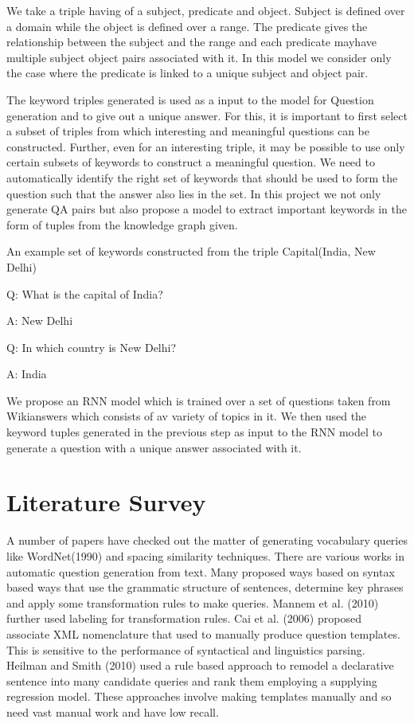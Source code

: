 \documentclass[conference]{IEEEtran}
\begin{document}
We take a triple having of a subject, predicate and object. Subject is defined over a domain
while the object is defined over a range. The predicate gives the relationship between the
subject and the range and each predicate mayhave multiple subject object pairs associated
with it. In this model we consider only the case where the predicate is linked to a unique
subject and object pair.

The keyword triples generated is used as a input to the model for Question generation and to give out a unique answer. For this, it is important to first select a subset of triples from which interesting and meaningful questions can be constructed. Further, even for an interesting triple, it may be possible to use only certain subsets of keywords to construct a meaningful question. We need to automatically identify the right set of keywords that should be used to form the question such that the answer also lies in the set. In this project we not only generate QA pairs but also propose a model to extract important keywords in the form of tuples from the knowledge graph given.
\newline

An example set of keywords constructed
from the triple Capital(India, New Delhi)

Q: What is the capital of India?

A: New Delhi

Q: In which country is New Delhi?

A: India

We propose an RNN model which is trained over a set of questions taken from Wikianswers which consists of av variety of topics in it. We then used the keyword tuples generated in the previous step as input to the RNN model to generate a question with a unique answer associated with it.

\section{Literature Survey}
A number of papers have checked out the matter of generating vocabulary queries like WordNet(1990) and spacing similarity techniques. There are various works in automatic question generation from text. Many
proposed ways based on syntax based ways that use the grammatic structure of sentences, determine key
phrases and apply some transformation rules to make queries. Mannem et al. (2010) further used labeling for transformation rules. Cai et al. (2006) proposed associate XML nomenclature that used to manually produce question templates. This is sensitive to the performance of syntactical and linguistics parsing. Heilman and Smith (2010) used a rule based approach to remodel a declarative sentence into many candidate queries and rank them employing a supplying regression model. These approaches involve making templates manually
and so need vast manual work and have low recall. 
\end{document}
